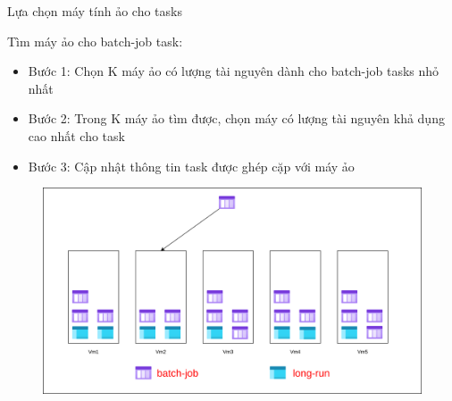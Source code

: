 \documentclass[11pt,xcolor={dvipsnames}, aspectratio=169]{beamer}
\begin{document}
\begin{frame}
{Lựa chọn máy tính ảo cho tasks}

	\begin{minipage}[t]{0.4\linewidth}
		\vspace{0.5cm}
		Tìm máy ảo cho batch-job task: 
		\begin{itemize}
			\item Bước 1: Chọn K máy ảo có lượng tài nguyên dành cho batch-job tasks nhỏ nhất 
			\item Bước 2: Trong K máy ảo tìm được, chọn máy có lượng tài nguyên khả dụng cao nhất cho task 
			\item {Bước 3}: Cập nhật thông tin task được ghép cặp với máy ảo
		\end{itemize}
	\end{minipage}
	\hfill
	\begin{minipage}[t]{0.59\linewidth}
	\begin{figure}
		\vspace{1cm}
		\includegraphics[scale=0.35]{images/balancing_tasks8.png}
	\end{figure}
	\vspace{1cm}
	\end{minipage}
\end{frame}
\end{document}
